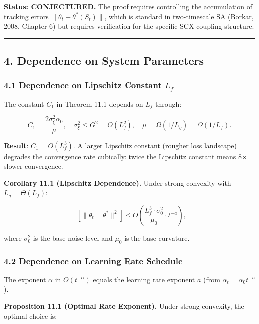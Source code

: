 \documentclass[
  12pt,
]{ctexart}
\begin{document}
\textbf{Status: CONJECTURED.} The proof requires controlling the
accumulation of tracking errors \(\|\theta_t - \theta^*(S_t)\|\), which
is standard in two-timescale SA (Borkar, 2008, Chapter 6) but requires
verification for the specific SCX coupling structure.

\begin{center}\rule{0.5\linewidth}{0.5pt}\end{center}

\subsection{4. Dependence on System
Parameters}\label{dependence-on-system-parameters}

\subsubsection{\texorpdfstring{4.1 Dependence on Lipschitz Constant
\(L_f\)}{4.1 Dependence on Lipschitz Constant L\_f}}\label{dependence-on-lipschitz-constant-l_f}

The constant \(C_1\) in Theorem 11.1 depends on \(L_f\) through:

\[C_1 = \frac{2\sigma_\xi^2 \alpha_0}{\mu}, \quad \sigma_\xi^2 \leq G^2 = O(L_f^2), \quad \mu = \Omega(1/L_g) = \Omega(1/L_f).\]

\textbf{Result}: \(C_1 = O(L_f^3)\). A larger Lipschitz constant
(rougher loss landscape) degrades the convergence rate cubically: twice
the Lipschitz constant means 8× slower convergence.

\textbf{Corollary 11.1 (Lipschitz Dependence).} Under strong convexity
with \(L_g = \Theta(L_f)\):

\[\mathbb{E}[\|\theta_t - \theta^*\|^2] \leq \tilde{O}\!\left(\frac{L_f^3 \cdot \sigma_0^2}{\mu_0} \cdot t^{-a}\right),\]

where \(\sigma_0^2\) is the base noise level and \(\mu_0\) is the base
curvature.

\subsubsection{4.2 Dependence on Learning Rate
Schedule}\label{dependence-on-learning-rate-schedule}

The exponent \(\alpha\) in \(O(t^{-\alpha})\) equals the learning rate
exponent \(a\) (from \(\alpha_t = \alpha_0 t^{-a}\)).

\textbf{Proposition 11.1 (Optimal Rate Exponent).} Under strong
convexity, the optimal choice is:
\end{document}
